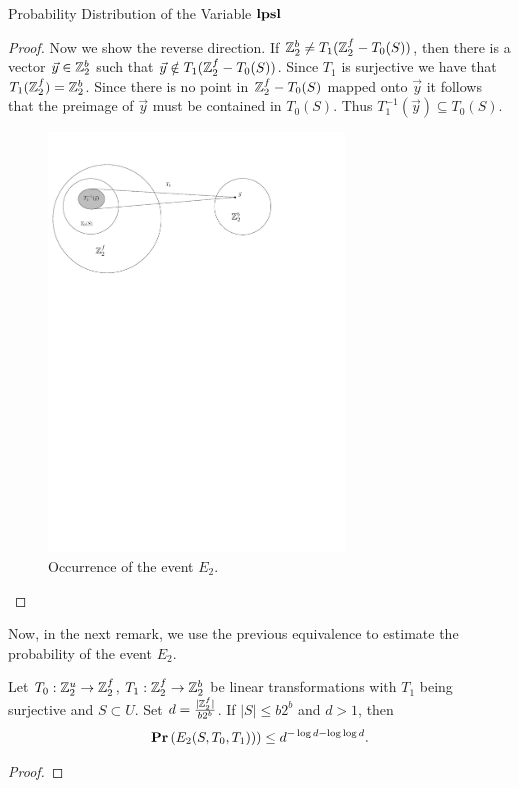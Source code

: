 \begin{section}{Probability Distribution of the Variable \texorpdfstring{$\mathbf{lpsl}$}{lpsl}}
\begin{proof}
Now we show the reverse direction. If $\mathbb{Z}_{2}^{b} \neq T_1(\mathbb{Z}_{2}^{f} - T_0(S))$, then there is a vector $\vec{y} \in \mathbb{Z}_{2}^{b}$ such that $\vec{y} \notin T_1(\mathbb{Z}_{2}^{f} - T_0(S))$. Since $T_1$ is surjective we have that $T_1(\mathbb{Z}_{2}^{f}) = \mathbb{Z}_{2}^{b}$. Since there is no point in $\mathbb{Z}_{2}^{f} - T_0(S)$ mapped onto $\vec{y}$ it follows that the preimage of $\vec{y}$ must be contained in $T_0(S)$. Thus $T_1^{-1}(\vec{y}) \subseteq T_0(S)$.

\begin{figure}
  \centering
    \includegraphics[width=0.7\textwidth]{images/e2}

  \caption{Occurrence of the event $E_2$.}
\end{figure}

\end{proof}

Now, in the next remark, we use the previous equivalence to estimate the probability of the event $E_2$.
\begin{remark}
\label{remark-e2-probability}
Let $T_0: \mathbb{Z}_{2}^{u} \rightarrow \mathbb{Z}_{2}^{f}$, $T_1: \mathbb{Z}_{2}^{f} \rightarrow \mathbb{Z}_{2}^{b}$ be linear transformations with $T_1$ being surjective and $S \subset U$. Set $d = \frac{|\mathbb{Z}_{2}^{f}|}{b 2 ^ b}$. If $|S| \leq b2 ^ b$ and $d > 1$, then 
\[
	\mathbf{Pr}\left(E_2(S, T_0, T_1))\right) \leq d^{-\log d - \log \log d} \text{.}
\]
\end{remark}
\begin{proof}


\end{proof}
\end{section}
